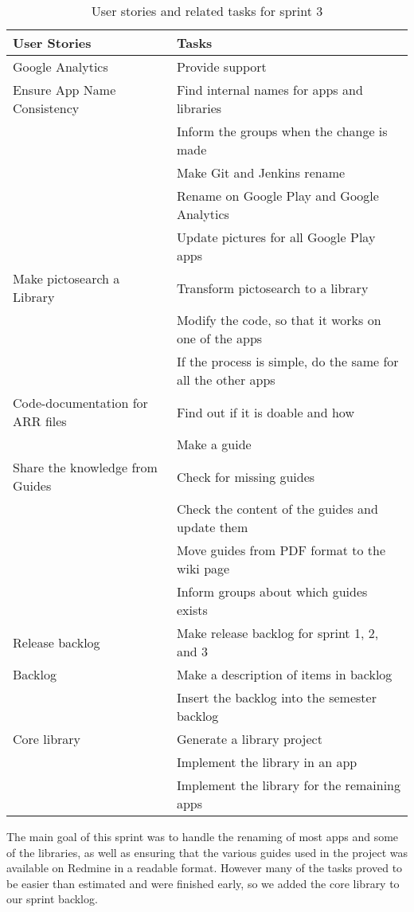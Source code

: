 \begin{table}
	\centering
	\begin{tabular}{ll}
		\textbf{User Stories} & \textbf{Tasks}\\ \hline \noalign{\vskip 2mm}
		Google Analytics & Provide support\\ \hline
		Ensure App Name Consistency & Find internal names for apps and libraries \\
		& Inform the groups when the change is made\\
		& Make Git and Jenkins rename \\
		& Rename on Google Play and Google Analytics \\
		& Update pictures for all Google Play apps\\ \hline
		Make pictosearch a Library & Transform pictosearch to a library \\
		& Modify the code, so that it works on one of the apps \\
		& If the process is simple, do the same for all the other apps \\ \hline
		Code-documentation for ARR files & Find out if it is doable and how \\
		& Make a guide \\ \hline
		Share the knowledge from Guides & Check for missing guides \\
		& Check the content of the guides and update them \\
		& Move guides from PDF format to the wiki page \\
		& Inform groups about which guides exists \\ \hline
		Release backlog & Make release backlog for sprint 1, 2, and 3 \\
		Backlog & Make a description of items in backlog \\
		& Insert the backlog into the semester backlog \\ \hline
		Core library & Generate a library project \\
		& Implement the library in an app \\
		& Implement the library for the remaining apps \\ \hline
	\end{tabular}
	\caption{User stories and related tasks for sprint 3}
	\label{Sprint3_UserStories3_table}
\end{table}
The main goal of this sprint was to handle the renaming of most apps and some of the libraries, as well as ensuring that the various guides used in the project was available on Redmine in a readable format. However many of the tasks proved to be easier than estimated and were finished early, so we added the core library to our sprint backlog.\\

